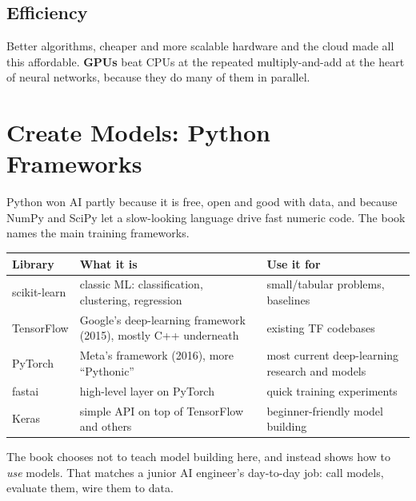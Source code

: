 \subsection{Efficiency}

Better algorithms, cheaper and more scalable hardware and the cloud made all this affordable.
\textbf{GPUs} beat CPUs at the repeated multiply-and-add at the heart of neural networks, because
they do many of them in parallel.

\section{Create Models: Python Frameworks}

Python won AI partly because it is free, open and good with data, and because NumPy and SciPy let a
slow-looking language drive fast numeric code. The book names the main training frameworks.

\begin{center}
\begin{tabularx}{\linewidth}{@{}l X X@{}}
\toprule
\textbf{Library} & \textbf{What it is} & \textbf{Use it for} \\
\midrule
scikit-learn & classic ML: classification, clustering, regression & small/tabular problems, baselines \\
TensorFlow & Google's deep-learning framework (2015), mostly C++ underneath & existing TF codebases \\
PyTorch & Meta's framework (2016), more ``Pythonic'' & most current deep-learning research and models \\
fastai & high-level layer on PyTorch & quick training experiments \\
Keras & simple API on top of TensorFlow and others & beginner-friendly model building \\
\bottomrule
\end{tabularx}
\end{center}

The book chooses not to teach model building here, and instead shows how to \emph{use} models. That
matches a junior AI engineer's day-to-day job: call models, evaluate them, wire them to data.

